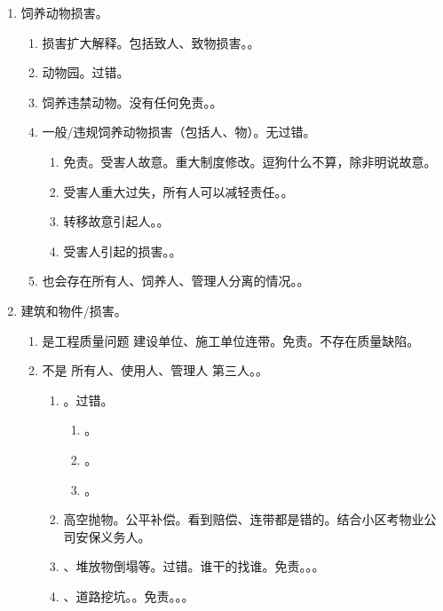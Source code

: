 \begin{enumerate}
  \item 饲养动物损害。
        \begin{enumerate}
          \item 损害扩大解释。包括致人、致物损害。。
          \item 动物园。过错。
          \item 饲养违禁动物。没有任何免责。。
          \item 一般/违规饲养动物损害（包括人、物）。无过错。
                \begin{enumerate}
                  \item 免责。受害人故意。重大制度修改。逗狗什么不算，除非明说故意。
                  \item 受害人重大过失，所有人可以减轻责任。。
                  \item 转移故意引起人。。
                  \item 受害人引起的损害。。
                \end{enumerate}
          \item 也会存在所有人、饲养人、管理人分离的情况。。
        \end{enumerate}
  \item 建筑和物件/损害。
        \begin{enumerate}
          \item 是工程质量问题 \yjt 建设单位、施工单位连带。免责。不存在质量缺陷。
          \item 不是 \yjt 所有人、使用人、管理人 \hz 第三人。。
                \begin{enumerate}
                  \item {}。过错。
                        \begin{enumerate}
                          \item {}。
                          \item {}。
                          \item {}。
                        \end{enumerate}
                  \item 高空抛物。公平补偿。看到赔偿、连带都是错的。结合小区考物业公司安保义务人。
                  \item {}、堆放物倒塌等。过错。谁干的找谁。免责。。。
                  \item {}、道路挖坑。。免责。。。
                \end{enumerate}
        \end{enumerate}
\end{enumerate}
